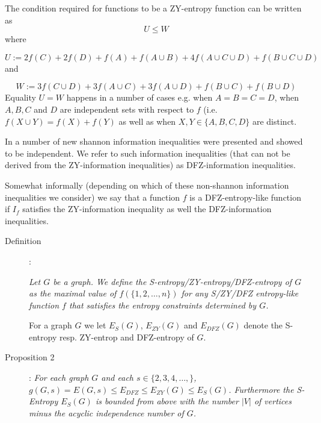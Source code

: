 \documentclass[12pt]{article}
\begin{document}
The condition required for functions to be a ZY-entropy function can be written as
\begin{equation}
U \leq W
\end{equation}
where

\begin{equation}
U:=2f(C)+2f(D)+f(A)+f(A \cup B)+4f(A \cup C \cup D) + f(B \cup C \cup D)
\end{equation}
and

\begin{equation}
W:=3f(C \cup D)+3f(A \cup C)+3f(A \cup D)+f(B \cup C)+f(B \cup D)
\end{equation}
Equality $U=W$ happens in a number of cases e.g. when $A=B=C=D$, when $A,B,C$ and $D$ are independent sets with respect to 
$f$ (i.e. $f(X \cup Y)=f(X)+f(Y)$  as well as when $X,Y \in \{A,B,C,D\}$ are distinct.

In \cite{DFZ07} a number of new shannon information inequalities were presented and showed to be independent. We refer to such information inequalities (that can not be derived from the ZY-information inequalities) as DFZ-information inequalities. 

Somewhat informally (depending on which of these non-shannon information inequalities we consider) we say that a function $f$ is a DFZ-entropy-like function if $I_f$ satisfies the ZY-information inequality as well the DFZ-information inequalities. 

\begin{description}

\item[Definition]:

\noindent
{\it Let $G$ be a graph. We define the  {\it S-entropy}/{\it ZY-entropy}/{\it DFZ-entropy} of $G$ as the maximal value of 
$f(\{1,2,\ldots, n\})$ for any  S/ZY/DFZ entropy-like function $f$ that satisfies the entropy constraints determined by $G$.

For a graph $G$ we let $E_{S}(G)$, $E_{ZY}(G)$ and $E_{DFZ}(G)$ denote the S-entropy resp. ZY-entrop and  DFZ-entropy of $G$. }

\end{description}

\begin{description}
\item[Proposition 2]:
\it
\noindent
For each graph $G$ and each $s \in \{2,3,4, \ldots, \}$,
$g(G,s)=E(G,s) \leq E_{DFZ} \leq E_{ZY}(G) \leq E_{S}(G)$.
Furthermore the S-Entropy $E_S(G)$ is bounded from above with the number $|V|$ 
of vertices minus the acyclic independence number of $G$. 
\end{description} 
\end{document}
